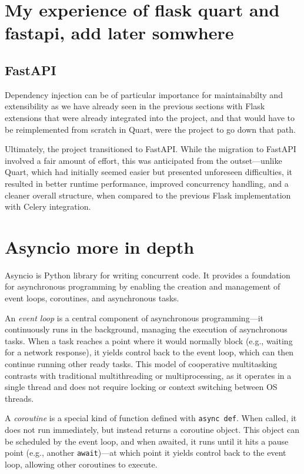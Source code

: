 \section{My experience of flask quart and fastapi, add later somwhere}
  


  \subsection{FastAPI}
    Dependency injection can be of particular importance for maintainabilty and extensibility as we have already seen in the previous 
    sections with Flask extensions that were already integrated into the project, and that would have to be reimplemented from scratch 
    in Quart, were the project to go down that path. 
    
    Ultimately, the project transitioned to FastAPI. While the migration to FastAPI involved a fair amount of effort, this 
    was anticipated from the outset—unlike Quart, which had initially seemed easier but presented unforeseen difficulties, 
    it resulted in better runtime performance, improved concurrency handling, and a cleaner overall structure, when compared 
    to the previous Flask implementation with Celery integration.


\section{Asyncio more in depth}

  Asyncio is Python library for writing concurrent code. It provides a foundation for asynchronous programming by enabling 
  the creation and management of event loops, coroutines, and asynchronous tasks.

  An \textit{event loop} is a central component of asynchronous programming—it continuously runs in the background, managing 
  the execution of asynchronous tasks. When a task reaches a point where it would normally block (e.g., waiting for a network 
  response), it yields control back to the event loop, which can then continue running other ready tasks. This model of 
  cooperative multitasking contrasts with traditional multithreading or multiprocessing, as it operates in a single thread 
  and does not require locking or context switching between OS threads.

  A \textit{coroutine} is a special kind of function defined with \texttt{async def}. When called, it does not run immediately, 
  but instead returns a coroutine object. This object can be scheduled by the event loop, and when awaited, it runs until it 
  hits a pause point (e.g., another \texttt{await})—at which point it yields control back to the event loop, allowing other 
  coroutines to execute.

